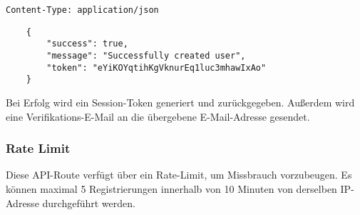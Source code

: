 \lstinline{Content-Type: application/json}
\begin{lstlisting}
    {
        "success": true, 
        "message": "Successfully created user",
        "token": "eYiKOYqtihKgVknurEq1luc3mhawIxAo"
    }
\end{lstlisting}

Bei Erfolg wird ein Session-Token generiert und zurückgegeben. Außerdem wird eine Verifikations-E-Mail an die übergebene E-Mail-Adresse gesendet.

\subsubsection{Rate Limit}

Diese API-Route verfügt über ein Rate-Limit, um Missbrauch vorzubeugen. Es können maximal 5 Registrierungen innerhalb von 10 Minuten von derselben IP-Adresse durchgeführt werden.